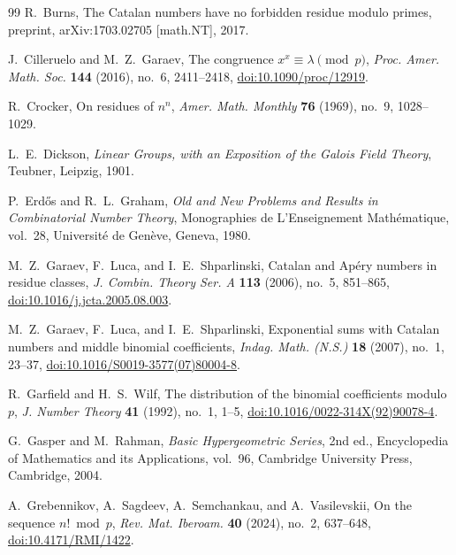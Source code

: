 \documentclass[11pt,reqno]{amsart}
\numberwithin{equation}{section}
\theoremstyle{definition}
\theoremstyle{remark}
\begin{document}
\begin{thebibliography}{99}
R.~Burns,
\newblock The Catalan numbers have no forbidden residue modulo primes,
\newblock preprint, arXiv:1703.02705 [math.NT], 2017.

J.~Cilleruelo and M.~Z.~Garaev,
\newblock The congruence $x^x\equiv\lambda\pmod p$,
\newblock \emph{Proc. Amer. Math. Soc.} \textbf{144} (2016), no.~6, 2411--2418,
\newblock \href{https://doi.org/10.1090/proc/12919}{doi:10.1090/proc/12919}.

R.~Crocker,
\newblock On residues of $n^n$,
\newblock \emph{Amer. Math. Monthly} \textbf{76} (1969), no.~9, 1028--1029.

L.~E.~Dickson,
\newblock \emph{Linear Groups, with an Exposition of the Galois Field Theory},
\newblock Teubner, Leipzig, 1901.

P.~Erd\H{o}s and R.~L.~Graham,
\newblock \emph{Old and New Problems and Results in Combinatorial Number Theory},
\newblock Monographies de L'Enseignement Math\'ematique, vol.~28,
Universit\'e de Gen\`eve, Geneva, 1980.

M.~Z.~Garaev, F.~Luca, and I.~E.~Shparlinski,
\newblock Catalan and Ap\'ery numbers in residue classes,
\newblock \emph{J. Combin. Theory Ser. A} \textbf{113} (2006), no.~5, 851--865,
\newblock \href{https://doi.org/10.1016/j.jcta.2005.08.003}{doi:10.1016/j.jcta.2005.08.003}.

M.~Z.~Garaev, F.~Luca, and I.~E.~Shparlinski,
\newblock Exponential sums with Catalan numbers and middle binomial coefficients,
\newblock \emph{Indag. Math. (N.S.)} \textbf{18} (2007), no.~1, 23--37,
\newblock \href{https://doi.org/10.1016/S0019-3577(07)80004-8}{doi:10.1016/S0019-3577(07)80004-8}.

R.~Garfield and H.~S.~Wilf,
\newblock The distribution of the binomial coefficients modulo $p$,
\newblock \emph{J. Number Theory} \textbf{41} (1992), no.~1, 1--5,
\newblock \href{https://doi.org/10.1016/0022-314X(92)90078-4}{doi:10.1016/0022-314X(92)90078-4}.

G.~Gasper and M.~Rahman,
\newblock \emph{Basic Hypergeometric Series},
\newblock 2nd ed., Encyclopedia of Mathematics and its Applications, vol.~96,
Cambridge University Press, Cambridge, 2004.

A.~Grebennikov, A.~Sagdeev, A.~Semchankau, and A.~Vasilevskii,
\newblock On the sequence $n!\bmod p$,
\newblock \emph{Rev. Mat. Iberoam.} \textbf{40} (2024), no.~2, 637--648,
\newblock \href{https://doi.org/10.4171/RMI/1422}{doi:10.4171/RMI/1422}.


\end{thebibliography}
\end{document}
